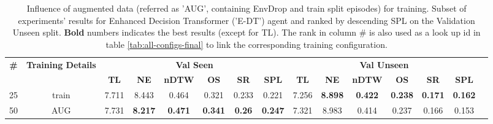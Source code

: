 \begin{table}
\centering
\caption{\label{tab:e_dt_env_drop}Influence of augmented data (referred as 'AUG', containing EnvDrop and train split episodes) for training. Subset of experiments' results for Enhanced Decision Transformer ('E-DT') agent and ranked by descending SPL on the Validation Unseen split. \textbf{Bold} numbers indicates the best results (except for TL). The rank in column \# is also used as a look up id in table \ref{tab:all-configs-final} to link the corresponding training configuration.}
\begin{tabular}{@{\hskip3pt}c@{\hskip3pt}c@{\hskip3pt}c@{\hskip3pt}c@{\hskip3pt}c@{\hskip3pt}c@{\hskip3pt}c@{\hskip3pt}c@{\hskip3pt}c@{\hskip3pt}c@{\hskip3pt}c@{\hskip3pt}c@{\hskip3pt}c@{\hskip3pt}c@{\hskip3pt}c}
\toprule
                                  \textbf{\#} & \textbf{Training Details} & \multicolumn{6}{c}{\textbf{Val Seen}} & \multicolumn{6}{c}{\textbf{Val Unseen}} \\
\cmidrule(l){3-8}\cmidrule(l){9-14}\textbf{~} &                \textbf{~} &       \textbf{TL} &     \textbf{NE} &   \textbf{nDTW} &     \textbf{OS} &    \textbf{SR} &    \textbf{SPL} &         \textbf{TL} &     \textbf{NE} &   \textbf{nDTW} &     \textbf{OS} &     \textbf{SR} &    \textbf{SPL} \\
\midrule
                                           25 &                     train &             7.711 &           8.443 &           0.464 &           0.321 &          0.233 &           0.221 &               7.256 &  \textbf{8.898} &  \textbf{0.422} &  \textbf{0.238} &  \textbf{0.171} &  \textbf{0.162} \\
                                           50 &                       AUG &             7.731 &  \textbf{8.217} &  \textbf{0.471} &  \textbf{0.341} &  \textbf{0.26} &  \textbf{0.247} &               7.321 &           8.983 &           0.414 &           0.237 &           0.166 &           0.153 \\
\bottomrule
\end{tabular}
\end{table}

